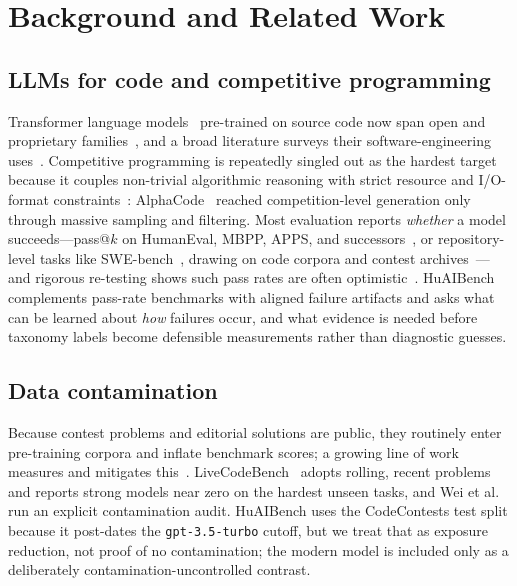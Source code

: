 \documentclass[conference]{IEEEtran}
\begin{document}
\section{Background and Related Work}
\label{sec:background}

\subsection{LLMs for code and competitive programming}
Transformer language models~\cite{vaswani2017attention,brown2020gpt3} pre-trained
on source code now span open and proprietary
families~\cite{chen2021codex,nijkamp2023codegen,roziere2023codellama,touvron2023llama,fried2023incoder,wang2021codet5,guo2024deepseekcoder,openai2023gpt4},
and a broad literature surveys their software-engineering
uses~\cite{hou2024llm4se}. Competitive programming is repeatedly singled out as the
hardest target because it couples non-trivial algorithmic reasoning with strict
resource and I/O-format constraints~\cite{li2022alphacode,wei2026evaluating}:
AlphaCode~\cite{li2022alphacode} reached competition-level generation only through
massive sampling and filtering. Most evaluation reports \emph{whether} a model
succeeds---pass@$k$ on HumanEval, MBPP, APPS, and successors~\cite{chen2021codex,austin2021mbpp,hendrycks2021apps,zhuo2024bigcodebench},
or repository-level tasks like SWE-bench~\cite{jimenez2024swebench}, drawing on code
corpora and contest archives~\cite{lu2021codexglue,puri2021codenet,kulal2019spoc}---and
rigorous re-testing shows such pass rates are often optimistic~\cite{liu2023evalplus}.
HuAIBench complements pass-rate benchmarks with aligned failure artifacts and asks
what can be learned about \emph{how} failures occur, and what evidence is needed
before taxonomy labels become defensible measurements rather than diagnostic guesses.

\subsection{Data contamination}
Because contest problems and editorial solutions are public, they routinely enter
pre-training corpora and inflate benchmark scores; a growing line of work measures
and mitigates this~\cite{sainz2023contamination,golchin2024timetravel,riddell2024quantifying,magar2022memorization}.
LiveCodeBench~\cite{jain2024livecodebench} adopts rolling, recent problems and
reports strong models near zero on the hardest unseen tasks, and Wei et
al.~\cite{wei2026evaluating} run an explicit contamination audit. HuAIBench uses the
CodeContests test split because it post-dates the \texttt{gpt-3.5-turbo} cutoff, but
we treat that as exposure reduction, not proof of no contamination; the modern model
is included only as a deliberately contamination-uncontrolled contrast.
\end{document}
